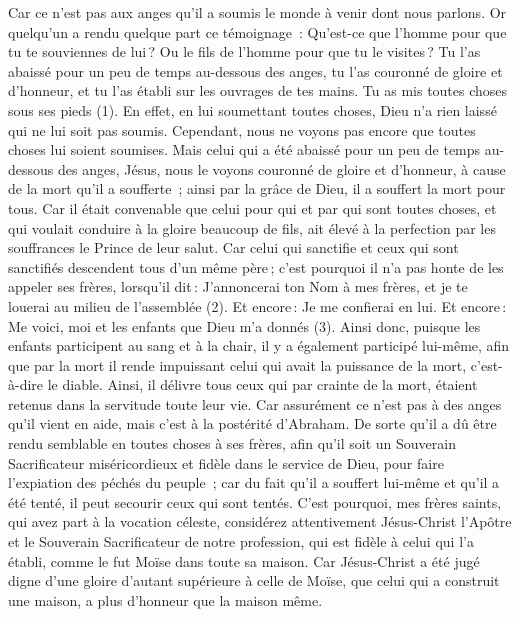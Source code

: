 \begin{multicols}{2}
Car ce n'est pas aux anges qu'il a soumis le monde à venir dont nous parlons.
Or quelqu'un a rendu quelque part ce témoignage : Qu'est-ce que l'homme pour que tu te souviennes de lui ? Ou le fils de l'homme pour que tu le visites ?
Tu l'as abaissé pour un peu de temps au-dessous des anges, tu l'as couronné de gloire et d'honneur, et tu l'as établi sur les ouvrages de tes mains.
Tu as mis toutes choses sous ses pieds (1). En effet, en lui soumettant toutes choses, Dieu n'a rien laissé qui ne lui soit pas soumis. Cependant, nous ne voyons pas encore que toutes choses lui soient soumises.
Mais celui qui a été abaissé pour un peu de temps au-dessous des anges, Jésus, nous le voyons couronné de gloire et d'honneur, à cause de la mort qu’il a soufferte ; ainsi par la grâce de Dieu, il a souffert la mort pour tous.
Car il était convenable que celui pour qui et par qui sont toutes choses, et qui voulait conduire à la gloire beaucoup de fils, ait élevé à la perfection par les souffrances le Prince de leur salut.
Car celui qui sanctifie et ceux qui sont sanctifiés descendent tous d'un même père ; c'est pourquoi il n’a pas honte de les appeler ses frères,
lorsqu’il dit : J'annoncerai ton Nom à mes frères, et je te louerai au milieu de l'assemblée (2).
Et encore : Je me confierai en lui. Et encore : Me voici, moi et les enfants que Dieu m'a donnés (3).
Ainsi donc, puisque les enfants participent au sang et à la chair, il y a également participé lui-même, afin que par la mort il rende impuissant celui qui avait la puissance de la mort, c'est-à-dire le diable.
Ainsi, il délivre tous ceux qui par crainte de la mort, étaient retenus dans la servitude toute leur vie.
Car assurément ce n’est pas à des anges qu’il vient en aide, mais c’est à la postérité d'Abraham.
De sorte qu’il a dû être rendu semblable en toutes choses à ses frères, afin qu'il soit un Souverain Sacrificateur miséricordieux et fidèle dans le service de Dieu, pour faire l’expiation des péchés du peuple ;
car du fait qu'il a souffert lui-même et qu’il a été tenté, il peut secourir ceux qui sont tentés.
\VerseOne{}C'est pourquoi, mes frères saints, qui avez part à la vocation céleste, considérez attentivement Jésus-Christ l'Apôtre et le Souverain Sacrificateur de notre profession,
qui est fidèle à celui qui l'a établi, comme le fut Moïse dans toute sa maison.
Car Jésus-Christ a été jugé digne d'une gloire d'autant supérieure à celle de Moïse, que celui qui a construit une maison, a plus d’honneur que la maison même.

\end{multicols}
